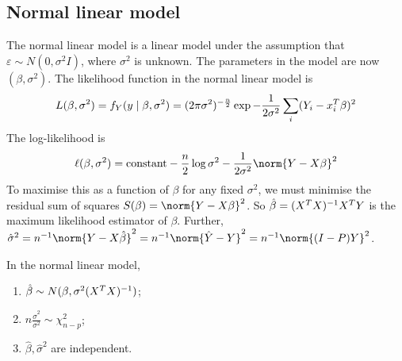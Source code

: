 \subsection{Normal linear model}
The normal linear model is a linear model under the assumption that $\varepsilon \sim N(0,\sigma^2 I)$, where $\sigma^2$ is unknown.
The parameters in the model are now $(\beta, \sigma^2)$.
The likelihood function in the normal linear model is
\begin{align*}
	L(\beta, \sigma^2) = f_Y(y\mid \beta,\sigma^2) = (2\pi \sigma^2)^{-\frac{n}{2}} \exp{-\frac{1}{2\sigma^2} \sum_i (Y_i - x_i^T\beta)^2}
\end{align*}
The log-likelihood is
\begin{align*}
	\ell(\beta,\sigma^2) = \text{constant} - \frac{n}{2}\log \sigma^2 - \frac{1}{2\sigma^2} \norm{Y-X\beta}^2
\end{align*}
To maximise this as a function of $\beta$ for any fixed $\sigma^2$, we must minimise the residual sum of squares $S(\beta) = \norm{Y-X\beta}^2$.
So $\hat \beta = (X^T X)^{-1} X^T Y$ is the maximum likelihood estimator of $\beta$.
Further, $\hat \sigma^2 = n^{-1} \norm{Y-X\hat\beta}^2 = n^{-1} \norm{\hat Y - Y}^2 = n^{-1} \norm{(I-P)Y}^2$.
\begin{theorem}
	In the normal linear model,
	\begin{enumerate}
		\item $\hat \beta \sim N(\beta,\sigma^2(X^T X)^{-1})$;
		\item $n\frac{\hat\sigma^2}{\sigma^2} \sim \chi^2_{n-p}$;
		\item $\hat \beta, \hat \sigma^2$ are independent.
	\end{enumerate}
\end{theorem}
